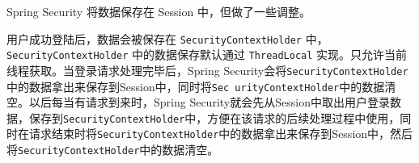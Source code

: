 Spring Security 将数据保存在 Session 中，但做了一些调整。

用户成功登陆后，数据会被保存在  \texttt{SecurityContextHolder} 中，\texttt{SecurityContextHolder} 中的数据保存默认通过 \texttt{ThreadLocal} 实现。只允许当前线程获取。当登录请求处理完毕后，Spring Security会将\texttt{SecurityContextHolder}中的数据拿出来保存到Session中，同时将\texttt{Sec urityContextHolder}中的数据清空。以后每当有请求到来时，Spring Security就会先从Session中取出用户登录数据，保存到\texttt{SecurityContextHolder}中，方便在该请求的后续处理过程中使用，同时在请求结束时将\texttt{SecurityContextHolder}中的数据拿出来保存到Session中，然后将\texttt{SecurityContextHolder}中的数据清空。

\newpage
